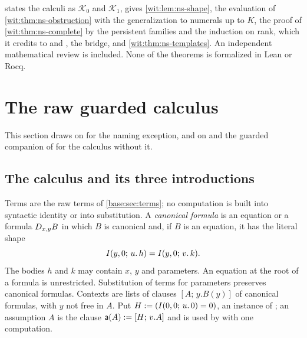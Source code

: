 \begin{remark}
\label{wit:rem:ns-package}
 states the calculi as $\mathcal K_0$ and
$\mathcal K_1$, gives \cref{wit:lem:ns-shape}, the evaluation of
\cref{wit:thm:ns-obstruction} with the generalization to numerals up to $K$,
the proof of \cref{wit:thm:ns-complete} by the persistent families and the
induction on rank, which it credits to  and
, the bridge, and \cref{wit:thm:ns-templates}.  An
independent mathematical review is included.  None of the theorems is
formalized in Lean or Rocq.
\end{remark}

\section{The raw guarded calculus}
\label{wit:sec:guarded}

This section draws on  for the naming
exception, and on  and the guarded companion of
 for the calculus without it.

\subsection{The calculus and its three introductions}

Terms are the raw terms of \cref{base:sec:terms}; no computation is built
into syntactic identity or into substitution.  A \emph{canonical formula} is
an equation or a formula $D_{x,y}B$ in which $B$ is canonical and, if $B$
is an equation, it has the literal shape
\begin{equation}
 I(y,0;\,u.\,h)=I(y,0;\,v.\,k).
 \label{wit:eq:guard}
\end{equation}
The bodies $h$ and $k$ may contain $x$, $y$ and parameters.  An equation at
the root of a formula is unrestricted.  Substitution of terms for
parameters preserves canonical formulas.  Contexts are lists of clauses
$[A;\,y.B(y)]$ of canonical formulas, with $y$ not free in $A$.  Put
$H\mathrel{:=}(I(0,0;\,u.\,0)=0)$, an instance of ; an assumption
$A$ is the clause $\mathsf{a}(A)\mathrel{:=}[H;\,v.A]$ and is used by
 with one computation.

